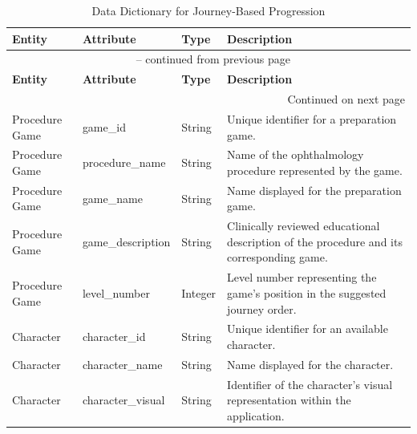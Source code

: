 \documentclass[10pt]{article}
\begin{document}
\begin{longtable}{
    p{}
    p{}
    p{}
    p{}
}

\caption{Data Dictionary for Journey-Based Progression}
\label{tab:JourneyDataDictionary}\\

\toprule
\textbf{Entity} &
\textbf{Attribute} &
\textbf{Type} &
\textbf{Description} \\
\midrule
\endfirsthead

\multicolumn{4}{c}{\tablename\ \thetable{} -- continued from previous page} \\
\toprule
\textbf{Entity} &
\textbf{Attribute} &
\textbf{Type} &
\textbf{Description} \\
\midrule
\endhead

\midrule
\multicolumn{4}{r}{Continued on next page} \\
\endfoot

\bottomrule
\endlastfoot

Procedure Game &
game\_id &
String &
Unique identifier for a preparation game. \\
\midrule

Procedure Game &
procedure\_name &
String &
Name of the ophthalmology procedure represented
by the game. \\
\midrule

Procedure Game &
game\_name &
String &
Name displayed for the preparation game. \\
\midrule

Procedure Game &
game\_description &
String &
Clinically reviewed educational description
of the procedure and its corresponding game. \\
\midrule

Procedure Game &
level\_number &
Integer &
Level number representing the game's position
in the suggested journey order. \\
\midrule

Character &
character\_id &
String &
Unique identifier for an available character. \\
\midrule

Character &
character\_name &
String &
Name displayed for the character. \\
\midrule

Character &
character\_visual &
String &
Identifier of the character's visual representation
within the application. \\
\midrule


\end{longtable}
\end{document}
